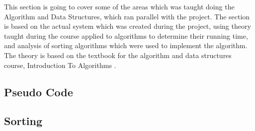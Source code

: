 This section is going to cover some of the areas which was taught doing the Algorithm and Data Structures, which ran parallel with the project. The section is based on the actual system which was created during the project, using theory taught during the course applied to algorithms to determine their running time, and analysis of sorting algorithms which were used to implement the algorithm. The theory is based on the textbook for the algorithm and data structures course, Introduction To Algorithms \cite{IntroToAlgorithms}.

\subsection{Pseudo Code}
\label{PesudoCode}

\subsection{Sorting}
\label{Sorting}
